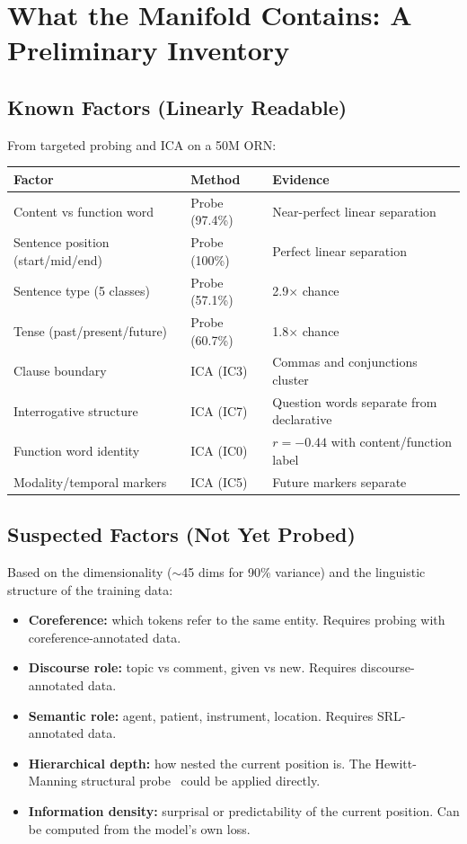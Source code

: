 \documentclass[11pt, a4paper]{article}
\theoremstyle{plain}
\theoremstyle{definition}
\theoremstyle{remark}
\begin{document}
\section{What the Manifold Contains: A Preliminary Inventory}
\label{sec:inventory}

\subsection{Known Factors (Linearly Readable)}

From targeted probing and ICA on a 50M ORN:

\begin{center}\small
\begin{tabular}{lll}
\toprule
\textbf{Factor} & \textbf{Method} & \textbf{Evidence} \\
\midrule
Content vs function word & Probe (97.4\%) & Near-perfect linear separation \\
Sentence position (start/mid/end) & Probe (100\%) & Perfect linear separation \\
Sentence type (5 classes) & Probe (57.1\%) & 2.9$\times$ chance \\
Tense (past/present/future) & Probe (60.7\%) & 1.8$\times$ chance \\
Clause boundary & ICA (IC3) & Commas and conjunctions cluster \\
Interrogative structure & ICA (IC7) & Question words separate from declarative \\
Function word identity & ICA (IC0) & $r = -0.44$ with content/function label \\
Modality/temporal markers & ICA (IC5) & Future markers separate \\
\bottomrule
\end{tabular}
\end{center}

\subsection{Suspected Factors (Not Yet Probed)}

Based on the dimensionality ($\sim$45 dims for 90\% variance) and the linguistic structure of the training data:

\begin{itemize}[nosep]
\item \textbf{Coreference:} which tokens refer to the same entity.
    Requires probing with coreference-annotated data.
\item \textbf{Discourse role:} topic vs comment, given vs new.
    Requires discourse-annotated data.
\item \textbf{Semantic role:} agent, patient, instrument, location.
    Requires SRL-annotated data.
\item \textbf{Hierarchical depth:} how nested the current position is.
    The Hewitt-Manning structural probe~\cite{hewitt2019probe} could be applied directly.
\item \textbf{Information density:} surprisal or predictability of the current position.
    Can be computed from the model's own loss.
\end{itemize}
\end{document}
